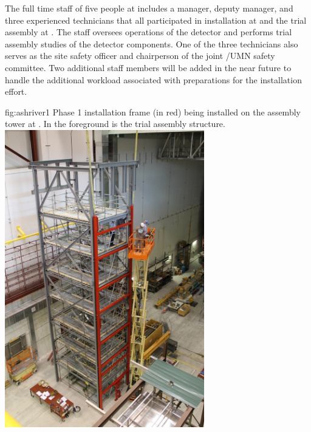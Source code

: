 The full time staff of five people at 
includes a manager, deputy manager, and three experienced technicians
that all participated in  installation at  and
the  trial assembly at .  The staff
oversees operations of the  detector and performs trial
assembly studies of the  detector components.  One of the
three technicians also serves as the site safety officer and
chairperson of the joint /UMN safety committee.  Two additional staff
members will be added in the near future to handle the additional
workload associated with preparations for the 
installation effort.
\begin{dunefigure}
  {fig:ashriver1}
  {Phase 1  installation frame (in red) being installed on the
   assembly tower at . In the foreground is
  the  trial assembly structure.}
   \includegraphics[width=0.65\textwidth]{graphics/ashriver_tower}
\end{dunefigure}


